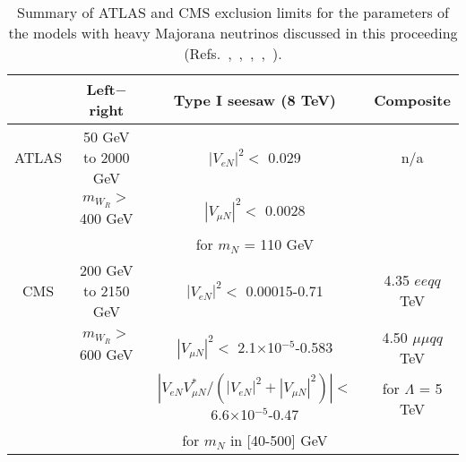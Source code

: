\documentclass[10pt]{article}
\begin{document}
\vskip-5pt
{\tiny  
\begin{table}[h!]
\begin{center}
{\scriptsize 
\begin{tabular}{|c|c|c|c|}
\hline
               & Left$-$right                  & Type I seesaw (8 TeV)        & Composite \\
\hline
 ATLAS         & 50 GeV to 2000 GeV          & $|V_{eN}|^2<$ 0.029            & n/a\\
               & $m_{W_R}>$ 400 GeV          & $|V_{\mu N}|^2<$ 0.0028        & \\
               &                             & for $m_N$ = 110  GeV           & \\ 
\hline
 CMS           & 200 GeV to 2150 GeV         & $|V_{eN}|^2<$ 0.00015-0.71                                                  &  4.35 $ee qq$  TeV \\
               & $m_{W_R}>$ 600 GeV          & $|V_{\mu N}|^2<$ 2.1$\times$10$^{-5}$-0.583                                 &  4.50 $\mu\mu qq$ TeV\\
               &                             & $|V_{eN}V_{\mu N}^*/(|V_{eN}|^2+|V_{\mu N}|^2)|<$ 6.6$\times$10$^{-5}$-0.47 &  for $\Lambda$ = 5 TeV\\
               &                             & for $m_N$ in [40-500] GeV                                                   & \\ 
\hline
\end{tabular}
\label{HMNsummary}
}
\end{center}
\vspace{-0.35cm}
\caption{Summary of ATLAS and CMS exclusion limits for the parameters of the models with heavy Majorana neutrinos discussed in this proceeding (Refs.~\cite{LR_CMS},~\cite{lljj8TeV_ATLAS},~\cite{lljj8TeV_CMS1},~\cite{lljj8TeV_CMS2},~\cite{HCMN_CMS}).}
\end{table}  

\vspace{-0.25cm}




}
\end{document}
